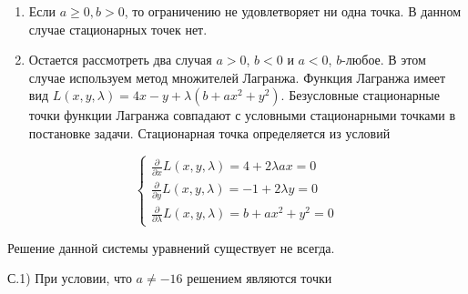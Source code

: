 \documentclass[addpoints, answers]{exam} %
\begin{document}
\begin{questions}
\begin{solution}
\begin{enumerate}
\item  Если $a\ge 0,b>0$, то ограничению не удовлетворяет ни одна точка. В данном случае стационарных точек нет.

\item  Остается рассмотреть два случая $a>0$, $b<0$ и $a<0$, $b$-любое. В этом случае используем метод множителей Лагранжа. Функция Лагранжа имеет вид $L\left(x,y,\lambda \right)=4x-y+\lambda \left(b+ax^{2} +y^{2} \right)$. Безусловные стационарные точки функции Лагранжа совпадают с условными стационарными точками в постановке задачи. Стационарная точка определяется из условий 
\end{enumerate}

\[
\left\{\begin{array}{c} {\frac{\partial }{\partial x} L\left(x,y,\lambda \right)=4+2\lambda ax=0} \\ {\frac{\partial }{\partial y} L\left(x,y,\lambda \right)=-1+2\lambda y=0} \\ {\frac{\partial }{\partial \lambda } L\left(x,y,\lambda \right)=b+ax^{2} +y^{2} =0} \end{array}\right. 
\]

Решение данной системы уравнений существует не всегда. 

С.1) При условии, что $a\ne -16$ решением являются точки


\end{solution}
\end{questions}
\end{document}
